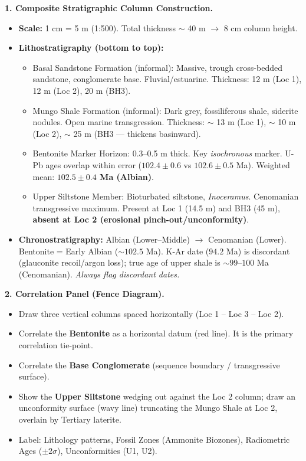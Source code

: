 \documentclass[11pt]{article}
\newcommand{\cle}[1]{{\popxbold\color{popdark}#1}}
\begin{document}
\begin{exoresolu}
\textbf{1. Composite Stratigraphic Column Construction.}
\begin{itemize}
    \item \textbf{Scale:} 1 cm = 5 m (1:500). Total thickness $\sim$ 40 m $\rightarrow$ 8 cm column height.
    \item \textbf{Lithostratigraphy (bottom to top):}
        \begin{itemize}
            \item \cle{Basal Sandstone Formation} (informal): Massive, trough cross-bedded sandstone, conglomerate base. Fluvial/estuarine. Thickness: 12 m (Loc 1), 12 m (Loc 2), 20 m (BH3).
            \item \cle{Mungo Shale Formation} (informal): Dark grey, fossiliferous shale, siderite nodules. Open marine transgression. Thickness: $\sim$ 13 m (Loc 1), $\sim$ 10 m (Loc 2), $\sim$ 25 m (BH3 — thickens basinward).
            \item \cle{Bentonite Marker Horizon}: 0.3--0.5 m thick. Key \emph{isochronous} marker. U-Pb ages overlap within error ($102.4 \pm 0.6$ vs $102.6 \pm 0.5$ Ma). Weighted mean: \textbf{$102.5 \pm 0.4$ Ma (Albian)}.
            \item \cle{Upper Siltstone Member}: Bioturbated siltstone, \emph{Inoceramus}. Cenomanian transgressive maximum. Present at Loc 1 (14.5 m) and BH3 (45 m), \textbf{absent at Loc 2 (erosional pinch-out/unconformity)}.
        \end{itemize}
    \item \textbf{Chronostratigraphy:} Albian (Lower--Middle) $\rightarrow$ Cenomanian (Lower). Bentonite = Early Albian ($\sim 102.5$ Ma). K-Ar date ($94.2$ Ma) is discordant (glauconite recoil/argon loss); true age of upper shale is $\sim 99$--$100$ Ma (Cenomanian). \emph{Always flag discordant dates.}
\end{itemize}

\textbf{2. Correlation Panel (Fence Diagram).}
\begin{itemize}
    \item Draw three vertical columns spaced horizontally (Loc 1 -- Loc 3 -- Loc 2).
    \item Correlate the \textbf{Bentonite} as a horizontal datum (red line). It is the primary correlation tie-point.
    \item Correlate the \textbf{Base Conglomerate} (sequence boundary / transgressive surface).
    \item Show the \textbf{Upper Siltstone} wedging out against the Loc 2 column; draw an unconformity surface (wavy line) truncating the Mungo Shale at Loc 2, overlain by Tertiary laterite.
    \item Label: Lithology patterns, Fossil Zones (Ammonite Biozones), Radiometric Ages ($\pm 2\sigma$), Unconformities (U1, U2).
\end{itemize}


\end{exoresolu}
\end{document}

